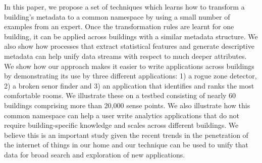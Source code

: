 
In this paper, we propose a set of techniques which learns how to transform a 
building's metadata 
to a common namespace by using a small number of examples from an expert. Once the transformation 
rules are learnt for one building, it can be applied across buildings with a similar 
metadata structure.  We also show how processes that extract statistical features and generate
descriptive metadata can help unify data streams with respect to much deeper attributes.
We show how our approach makes it easier to write applications across buildings by
demonstrating its use by three different applications: 1) a rogue zone detector, 2)
a broken senor finder and 3) an application that identifies and ranks the most comfortable
rooms. We illustrate these on a testbed consisting of nearly 60 buildings comprising more 
than 20,000 sense points. We also illustrate how this common namespace can help a user write 
analytics applications that do not require building-specific knowledge and scales across 
different buildings.
We believe this is an important study given the recent trends in the penetration
of the internet of things in our home and our technique can be used to unify that data
for broad search and exploration of new applications.


 

